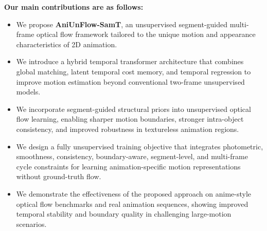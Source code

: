 \textbf{Our main contributions are as follows:}
\begin{itemize}
    \item We propose \textbf{AniUnFlow-SamT}, an unsupervised segment-guided multi-frame optical flow framework tailored to the unique motion and appearance characteristics of 2D animation.
    \item We introduce a hybrid temporal transformer architecture that combines global matching, latent temporal cost memory, and temporal regression to improve motion estimation beyond conventional two-frame unsupervised models.
    \item We incorporate segment-guided structural priors into unsupervised optical flow learning, enabling sharper motion boundaries, stronger intra-object consistency, and improved robustness in textureless animation regions.
    \item We design a fully unsupervised training objective that integrates photometric, smoothness, consistency, boundary-aware, segment-level, and multi-frame cycle constraints for learning animation-specific motion representations without ground-truth flow.
    \item We demonstrate the effectiveness of the proposed approach on anime-style optical flow benchmarks and real animation sequences, showing improved temporal stability and boundary quality in challenging large-motion scenarios.
\end{itemize}
